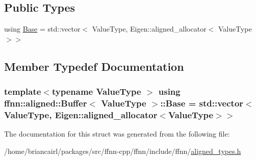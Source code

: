 \subsection*{Public Types}
\begin{DoxyCompactItemize}
\item 
using \hyperlink{structffnn_1_1aligned_1_1_buffer_af6851eeb6c392f2ecf7ad9e74fa0b650}{Base} = std\-::vector$<$ Value\-Type, Eigen\-::aligned\-\_\-allocator$<$ Value\-Type $>$$>$
\end{DoxyCompactItemize}


\subsection{Member Typedef Documentation}
\hypertarget{structffnn_1_1aligned_1_1_buffer_af6851eeb6c392f2ecf7ad9e74fa0b650}{
\subsubsection[{Base}]{\setlength{\rightskip}{0pt plus 5cm}template$<$typename Value\-Type $>$ using {\bf ffnn\-::aligned\-::\-Buffer}$<$ Value\-Type $>$\-::{\bf Base} =  std\-::vector$<$Value\-Type, Eigen\-::aligned\-\_\-allocator$<$Value\-Type$>$$>$}}\label{structffnn_1_1aligned_1_1_buffer_af6851eeb6c392f2ecf7ad9e74fa0b650}


The documentation for this struct was generated from the following file\-:\begin{DoxyCompactItemize}
\item 
/home/briancairl/packages/src/ffnn-\/cpp/ffnn/include/ffnn/\hyperlink{aligned__types_8h}{aligned\-\_\-types.\-h}\end{DoxyCompactItemize}
